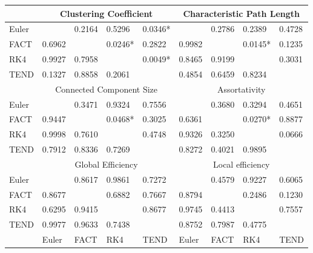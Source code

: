 \documentclass{frontiersSCNS} %
\begin{document}
\begin{table}[!t]
{\begin{tabular}{l | llll | llll }
\midrule
 & \multicolumn{4}{c}{Clustering Coefficient} &  \multicolumn{4}{c}{Characteristic Path Length} \\ 
\midrule
Euler  &            & 0.2164  & 0.5296    & 0.0346*   &            & 0.2786  & 0.2389    &  0.4728  \\
FACT & 0.6962 &              & 0.0246*  & 0.2822     & 0.9982 &            &  0.0145*   & 0.1235     \\
RK4   & 0.9927 & 0.7958  &               & 0.0049*   & 0.8465 & 0.9199  &                 & 0.3031   \\
TEND & 0.1327 & 0.8858  & 0.2061    &                & 0.4854 & 0.6459  & 0.8234   &    \\ 
\midrule
 & \multicolumn{4}{c}{Connected Component Size} &  \multicolumn{4}{c}{Assortativity} \\ 
\midrule
Euler  &            & 0.3471  & 0.9324    & 0.7556   &            & 0.3680  & 0.3294   &  0.4651  \\
FACT & 0.9447 &              & 0.0468*  & 0.3025     & 0.6361 &            &  0.0270*   & 0.8877     \\
RK4   & 0.9998 &  0.7610  &              & 0.4748   & 0.9326 & 0.3250  &               & 0.0666   \\
TEND & 0.7912 & 0.8336  & 0.7269   &                & 0.8272 & 0.4021  & 0.9895   &    \\ 
\midrule
 & \multicolumn{4}{c}{Global Efficiency} &  \multicolumn{4}{c}{Local efficiency} \\ 
\midrule
Euler  &            & 0.8617  & 0.9861    & 0.7272   &            & 0.4579  & 0.9227   &  0.6065  \\
FACT & 0.8677 &              & 0.6882  & 0.7667     & 0.8794 &            &  0.2486   & 0.1230     \\
RK4   & 0.6295 &  0.9415  &              & 0.8677   & 0.9745 & 0.4413  &               & 0.7557   \\
TEND & 0.9977 & 0.9633  & 0.7438    &                & 0.8752 & 0.7987  & 0.4775   &    \\ 
\midrule
         & Euler    & FACT     & RK4        & TEND       & Euler    & FACT     & RK4        & TEND      \\
\midrule
\end{tabular}}{}
\end{table}
\end{document}
